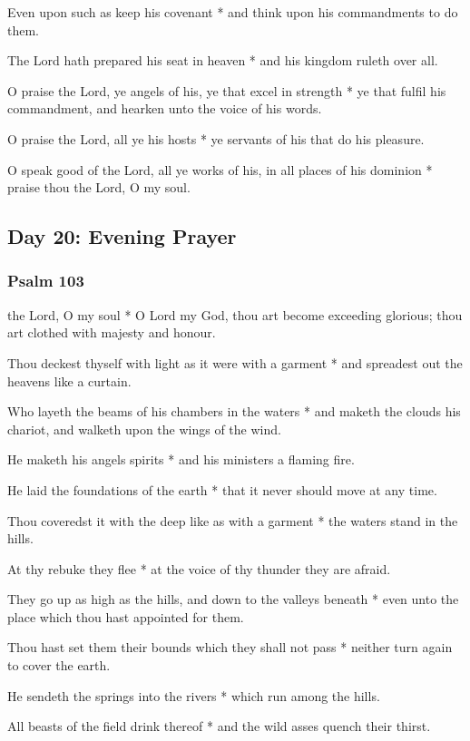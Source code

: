 Even upon such as keep his covenant * and think upon his commandments to do them.

The Lord hath prepared his seat in heaven * and his kingdom ruleth over all.

O praise the Lord, ye angels of his, ye that excel in strength * ye that fulfil his commandment, and hearken unto the voice of his words.

O praise the Lord, all ye his hosts * ye servants of his that do his pleasure.

O speak good of the Lord, all ye works of his, in all places of his dominion * praise thou the Lord, O my soul.

\subsection{Day 20: Evening Prayer}

\subsubsection{Psalm 103}


 the Lord, O my soul * O Lord my God, thou art become exceeding glorious; thou art clothed with majesty and honour.

Thou deckest thyself with light as it were with a garment * and spreadest out the heavens like a curtain.

Who layeth the beams of his chambers in the waters * and maketh the clouds his chariot, and walketh upon the wings of the wind.

He maketh his angels spirits * and his ministers a flaming fire.

He laid the foundations of the earth * that it never should move at any time.

Thou coveredst it with the deep like as with a garment * the waters stand in the hills.

At thy rebuke they flee * at the voice of thy thunder they are afraid.

They go up as high as the hills, and down to the valleys beneath * even unto the place which thou hast appointed for them.

Thou hast set them their bounds which they shall not pass * neither turn again to cover the earth.

He sendeth the springs into the rivers * which run among the hills.

All beasts of the field drink thereof * and the wild asses quench their thirst.


